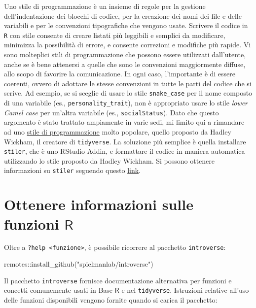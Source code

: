 \documentclass[
  10pt,
  italian,
  a4paper,
  extrafontsizes,onecolumn,openright
  ]{memoir}
\newenvironment{Shaded}{\begin{snugshade}}{\end{snugshade}}
\newcommand{\FunctionTok}[1]{\textcolor[rgb]{0.00,0.00,0.00}{#1}}
\newcommand{\NormalTok}[1]{#1}
\newcommand{\SpecialCharTok}[1]{\textcolor[rgb]{0.00,0.00,0.00}{#1}}
\newcommand{\StringTok}[1]{\textcolor[rgb]{0.31,0.60,0.02}{#1}}
\newcommand{\R}{\textsf{R}} %
\begin{document}
Uno stile di programmazione è un insieme di regole per la gestione dell'indentazione dei blocchi di codice, per la creazione dei nomi dei file e delle variabili e per le convenzioni tipografiche che vengono usate. Scrivere il codice in \texttt{R} con stile consente di creare listati più leggibili e semplici da modificare, minimizza la possibilità di errore, e consente correzioni e modifiche più rapide. Vi sono molteplici stili di programmazione che possono essere utilizzati dall'utente, anche se è bene attenersi a quelle che sono le convenzioni maggiormente diffuse, allo scopo di favorire la comunicazione. In ogni caso, l'importante è di essere coerenti, ovvero di adottare le stesse convenzioni in tutte le parti del codice che si scrive. Ad esempio, se si sceglie di usare lo stile \texttt{snake\_case} per il nome composto di una variabile (es., \texttt{personality\_trait}), non è appropriato usare lo stile \emph{lower Camel case} per un'altra variabile (es., \texttt{socialStatus}). Dato che questo argomento è stato trattato ampiamente in varie sedi, mi limito qui a rimandare ad uno \href{http://style.tidyverse.org/}{stile di programmazione} molto popolare, quello proposto da Hadley Wickham, il creatore di \texttt{tidyverse}. La soluzione più semplice è quella installare \texttt{stiler}, che è uno RStudio Addin, e formattare il codice in maniera automatica utilizzando lo stile proposto da Hadley Wickham. Si possono ottenere informazioni su \texttt{stiler} seguendo questo \href{https://github.com/r-lib/styler}{link}.

\hypertarget{ottenere-informazioni-sulle-funzioni-r}{%
\section{\texorpdfstring{Ottenere informazioni sulle funzioni \(\R\)}{Ottenere informazioni sulle funzioni \textbackslash R}}\label{ottenere-informazioni-sulle-funzioni-r}}

Oltre a \texttt{?help\ \textless{}funzione\textgreater{}}, è possibile ricorrere al pacchetto \texttt{introverse}:

\begin{Shaded}
\begin{Highlighting}[]
\NormalTok{remotes}\SpecialCharTok{::}\FunctionTok{install\_github}\NormalTok{(}\StringTok{"spielmanlab/introverse"}\NormalTok{)}
\end{Highlighting}
\end{Shaded}

\noindent
Il pacchetto \texttt{introverse} fornisce documentazione alternativa per funzioni e concetti comunemente usati in Base \(\R\) e nel \texttt{tidyverse}. Istruzioni relative all'uso delle funzioni disponibili vengono fornite quando si carica il pacchetto:
\end{document}
